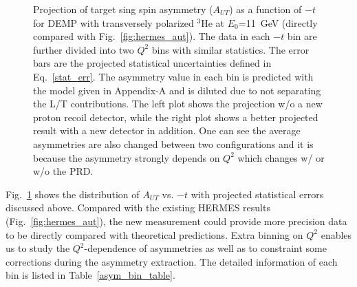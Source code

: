\begin{figure}[!ht]
 \begin{center}
      \caption{\footnotesize{Projection of target sing spin asymmetry
          ($A_{UT}$) as a function of $-t$ for DEMP with transversely polarized
          $\mathrm{^{3}He}$ at $E_{0}$=11~GeV (directly compared with Fig.~\ref{fig:hermes_aut}). 
          The data in each $-t$ bin are further divided into two $Q^{2}$ bins with similar statistics. 
          The error bars are the projected
          statistical uncertainties defined in Eq.~\ref{stat_err}. The
          asymmetry value in each bin is predicted with the model given in Appendix-A and is diluted due to not separating the L/T
          contributions. The left plot shows the projection w/o a new proton
          recoil detector, while the right plot shows a better projected result
          with a new detector in addition. One can see the average asymmetries are also
          changed between two configurations and it is because the asymmetry
          strongly depends on $Q^{2}$ which changes w/ or w/o the PRD.}}
  \label{asym_t}
  \end{center}
\end{figure}
Fig.~\ref{asym_t} shows the distribution of $A_{UT}$ vs. $-t$ with projected
statistical errors discussed above. Compared with the existing HERMES results
(Fig.~\ref{fig:hermes_aut}), the new measurement could provide more precision
data to be directly compared with theoretical predictions. Extra binning on $Q^{2}$ enables us to 
study the $Q^{2}$-dependence of asymmetries as well as to constraint some corrections during the asymmetry extraction. 
The detailed information of each bin is listed in Table~\ref{asym_bin_table}.


